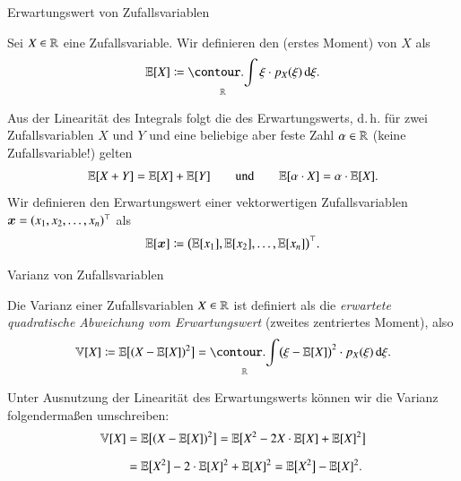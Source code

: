 \begin{frame}{Erwartungswert von Zufallsvariablen}{}
	\begin{mydef}
		Sei $X \in \mathbb{R}$ eine Zufallsvariable. Wir definieren den  (erstes Moment) von $X$ als
		\begin{equation*}
			\E[X] \coloneqq \int_{\R} \xi \cdot p_X(\xi)\,\diff\xi.
		\end{equation*}
	\end{mydef}

	Aus der Linearität des Integrals folgt die des Erwartungswerts, d.\,h. für zwei Zufallsvariablen $X$ und $Y$
	und eine beliebige aber feste Zahl $\alpha \in \mathbb{R}$ (keine Zufallsvariable!) gelten
	\begin{equation*}
		\mathbb{E}[X + Y] = \mathbb{E}[X] + \mathbb{E}[Y] \qquad\text{und}\qquad \mathbb{E}[\alpha \cdot X] = \alpha \cdot \mathbb{E}[X].
	\end{equation*}
	Wir definieren den Erwartungswert einer vektorwertigen Zufallsvariablen $\bm{x} = (x_1, x_2, \ldots, x_n)^\top$ als
	\begin{equation*}
		\mathbb{E}[\bm{x}] \coloneqq \bigl( \mathbb{E}[x_1], \mathbb{E}[x_2], \ldots, \mathbb{E}[x_n] \bigr)^\top.
	\end{equation*}
\end{frame}


\begin{frame}{Varianz von Zufallsvariablen}{}
	\begin{mydef}
		Die Varianz einer Zufallsvariablen $X \in \mathbb{R}$ ist definiert als die \textit{erwartete quadratische Abweichung
		vom Erwartungswert} (zweites zentriertes Moment), also
		\begin{equation*}
			\V[X] \coloneqq \E\bigl[ (X - \E[X])^2 \bigr] = \int_\R \bigl( \xi - \E[X] \bigr)^2 \cdot p_X(\xi)\,\diff\xi.
		\end{equation*}
	\end{mydef}

	Unter Ausnutzung der Linearität des Erwartungswerts können wir die Varianz folgendermaßen umschreiben:
	\begin{align*}
		\mathbb{V}[X]
			&= \mathbb{E}\bigl[ (X - \mathbb{E}[X])^2 \bigr] = \mathbb{E}\bigl[ X^2 - 2X \cdot \mathbb{E}[X] + \mathbb{E}[X]^2 \bigr]
	\\[2mm]
			&= \mathbb{E}\bigl[ X^2 \bigr] - 2 \cdot \mathbb{E}[X]^2 + \mathbb{E}[X]^2
				= \mathbb{E}\bigl[ X^2 \bigr] - \mathbb{E}[X]^2.
	\end{align*}
\end{frame}



